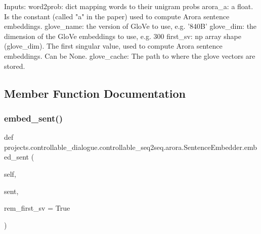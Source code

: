 \begin{DoxyVerb}  Inputs:
    word2prob: dict mapping words to their unigram probs
    arora_a: a float. Is the constant (called "a" in the paper)
      used to compute Arora sentence embeddings.
    glove_name: the version of GloVe to use, e.g. '840B'
    glove_dim: the dimension of the GloVe embeddings to use, e.g. 300
    first_sv: np array shape (glove_dim). The first singular value,
      used to compute Arora sentence embeddings. Can be None.
    glove_cache: The path to where the glove vectors are stored.
\end{DoxyVerb}
 

\subsection{Member Function Documentation}
\mbox{\label{classprojects_1_1controllable__dialogue_1_1controllable__seq2seq_1_1arora_1_1SentenceEmbedder_aea0dbc0848f20665f18c7aabc737ce7f}} 
\subsubsection{\texorpdfstring{embed\+\_\+sent()}{embed\_sent()}}
{\footnotesize\ttfamily def projects.\+controllable\+\_\+dialogue.\+controllable\+\_\+seq2seq.\+arora.\+Sentence\+Embedder.\+embed\+\_\+sent (\begin{DoxyParamCaption}\item[{}]{self,  }\item[{}]{sent,  }\item[{}]{rem\+\_\+first\+\_\+sv = {\ttfamily True} }\end{DoxyParamCaption})}

